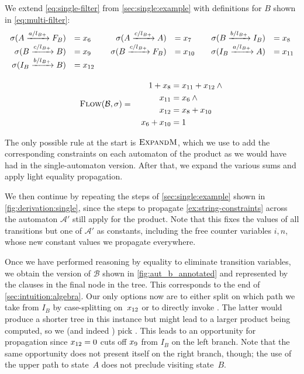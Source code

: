 We extend \cref{eq:single-filter} from \cref{sec:single:example} with
definitions for $B$ shown in \cref{eq:multi-filter}:
\begin{equation}\label{eq:multi-filter}
  \begin{array}{rl@{\qquad}rl@{\qquad}rl}
     \Filter(\FromLabelTo{A}{a / l_{B+}}{F_B} ) &= \TransitionVar_6 
     &
     \Filter(\FromLabelTo{A}{c / l_{B+}}{A} ) &= \TransitionVar_7 
     &
      \Filter(\FromLabelTo{B}{b / l_{B+}}{I_B}) &= \TransitionVar_8 
     \\
     \Filter(\FromLabelTo{B}{c / l_{B+}}{B}) &= \TransitionVar_9 
     &
     \Filter(\FromLabelTo{B}{c / l_{B+}}{F_B}) &= \TransitionVar_{10}
     &
     \Filter(\FromLabelTo{I_B}{a / l_{B+}}{A}) &= \TransitionVar_{11}
     \\
      \Filter(\FromLabelTo{I_B}{b / l_{B+}}{B}) &= \TransitionVar_{12}
    \\[3ex]
% 
    \multicolumn{6}{c}{
        \FlowEq(\mathcal{B}, \Filter) =\quad  \begin{aligned}
            1 + \TransitionVar_{8}   &= \TransitionVar_{11} + \TransitionVar_{12} \wedge\mbox{}\\
            \TransitionVar_{11} &= \TransitionVar_6\wedge\mbox{}\\
            \TransitionVar_{12} &= \TransitionVar_8 + \TransitionVar_{10}\mbox{}\\
            \TransitionVar_6 + \TransitionVar_{10} &= 1
        \end{aligned}}
  \end{array}
\end{equation}

The only possible rule at the start is $\textsc{ExpandM}$, which we use to add the
corresponding constraints on each automaton of the product as we would have had
in the single-automaton version. After that, we expand the various sums and apply
light equality propagation.

We then continue by repeating the steps of \cref{sec:single:example} shown in
\cref{fig:derivation:single}, since the steps to propagate
\cref{ex:string-constraints} across the automaton $\mathcal{A}'$ still apply for the
product. Note that this fixes the values of all transitions but one of $\mathcal{A}'$ as
constants, including the free counter variables $i, n$, whose new constant
values we propagate everywhere.

Once we have performed reasoning by equality to eliminate transition variables,
we obtain the version of $\mathcal{B}$ shown in \cref{fig:aut_b_annotated} and represented
by the clauses in the final node in the tree. This corresponds to the end of
\cref{sec:intuition:algebra}. Our only options now are to either split on which
path we take from $I_B$ by case-splitting on~$x_{12}$ or to
directly invoke \Materialise{}. The latter would produce a shorter tree in this
instance but might lead to a larger product being computed, so we (and indeed
\Catra{}) pick \Split{}. This leads to an opportunity for propagation since
$x_{12} = 0$ cuts off $x_{9}$ from $I_B$ on the left
branch. Note that the same opportunity does not present itself on the right
branch, though; the use of the upper path to state~$A$ does not preclude visiting
state~$B$.

